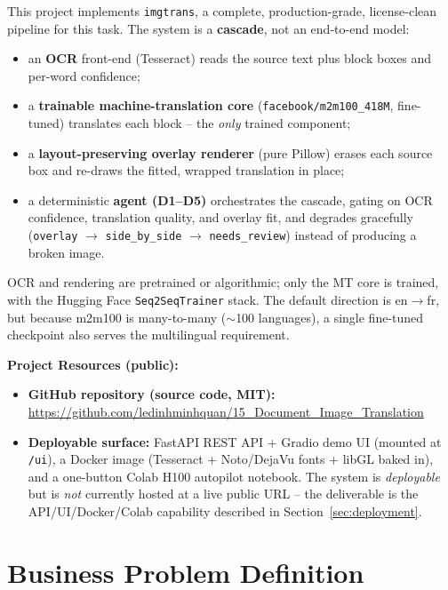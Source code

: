 \documentclass[12pt,a4paper]{article}
\begin{document}
This project implements \texttt{imgtrans}, a complete, production-grade, license-clean pipeline for this task. The system is a \textbf{cascade}, not an end-to-end model:

\begin{itemize}
  \item an \textbf{OCR} front-end (Tesseract) reads the source text plus block boxes and per-word confidence;
  \item a \textbf{trainable machine-translation core} (\texttt{facebook/m2m100\_418M}, fine-tuned) translates each block -- the \emph{only} trained component;
  \item a \textbf{layout-preserving overlay renderer} (pure Pillow) erases each source box and re-draws the fitted, wrapped translation in place;
  \item a deterministic \textbf{agent (D1--D5)} orchestrates the cascade, gating on OCR confidence, translation quality, and overlay fit, and degrades gracefully (\texttt{overlay} $\rightarrow$ \texttt{side\_by\_side} $\rightarrow$ \texttt{needs\_review}) instead of producing a broken image.
\end{itemize}

OCR and rendering are pretrained or algorithmic; only the MT core is trained, with the Hugging Face \texttt{Seq2SeqTrainer} stack. The default direction is en$\rightarrow$fr, but because m2m100 is many-to-many ($\sim$100 languages), a single fine-tuned checkpoint also serves the multilingual requirement.

\textbf{Project Resources (public):}
\begin{itemize}\setlength\itemsep{0.15em}
  \item \textbf{GitHub repository (source code, MIT):} \url{https://github.com/ledinhminhquan/15_Document_Image_Translation}
  \item \textbf{Deployable surface:} FastAPI REST API + Gradio demo UI (mounted at \texttt{/ui}), a Docker image (Tesseract + Noto/DejaVu fonts + libGL baked in), and a one-button Colab H100 autopilot notebook. The system is \emph{deployable} but is \emph{not} currently hosted at a live public URL -- the deliverable is the API/UI/Docker/Colab capability described in Section~\ref{sec:deployment}.
\end{itemize}

\section{Business Problem Definition}
\end{document}
